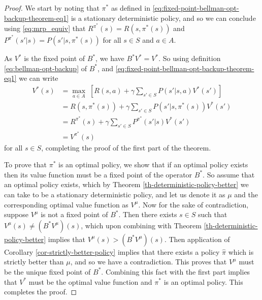 \documentclass{article}
\theoremstyle{definition}
\theoremstyle{remark}
\begin{document}
\begin{proof}
We start by noting that $\pi^{\ast}$ as defined in \eqref{eq:fixed-point-bellman-opt-backup-theorem-eq1} is a stationary deterministic policy, and so we can conclude using \eqref{eq:mrp_equiv} that $R^{\pi^{\ast}}(s) = R(s,\pi^{\ast}(s))$ and $P^{\pi^{\ast}}(s'|s)=P(s'|s,\pi^{\ast}(s))$ for all $s \in S$ and $a \in A$.

As $V^{\ast}$ is the fixed point of $B^{\ast}$, we have $B^{\ast}V^{\ast}=V^{\ast}$. So using definition \eqref{eq:bellman-opt-backup} of $B^{\ast}$, and \eqref{eq:fixed-point-bellman-opt-backup-theorem-eq1} we can write
\begin{equation}
\begin{split}
V^{\ast}(s) &= \underset{a \in A}{\max} \; \left[ R(s,a) + \gamma \sum_{s' \in S} P(s'|s,a)V^{\ast}(s') \right] \\
&= R(s,\pi^{\ast}(s)) + \gamma \sum_{s' \in S} P(s'|s,\pi^{\ast}(s))V^{\ast}(s') \\
&= R^{\pi^{\ast}}(s) + \gamma \sum_{s' \in S} P^{\pi^{\ast}}(s'|s) V^{\ast}(s') \\
&= V^{\pi^{\ast}}(s) 
\end{split}
\label{eq:fixed-point-bellman-opt-backup-proof-eq1}
\end{equation}
for all $s \in S$, completing the proof of the first part of the theorem.

To prove that $\pi^{\ast}$ is an optimal policy, we show that if an optimal policy exists then its value function must be a fixed point of the operator $B^{\ast}$. So assume that an optimal policy exists, which by Theorem \ref{th-deterministic-policy-better} we can take to be a stationary deterministic policy, and let us denote it as $\mu$ and the corresponding optimal value function as $V^{\mu}$. Now for the sake of contradiction, suppose $V^{\mu}$ is not a fixed point of $B^{\ast}$. Then there exists $s \in S$ such that $V^{\mu}(s) \neq (B^{\ast}V^{\mu})(s)$, which upon combining with Theorem \ref{th-deterministic-policy-better} implies that $V^{\mu}(s) > (B^{\ast}V^{\mu})(s)$. Then application of Corollary \ref{cor-strictly-better-policy} implies that there exists a policy $\hat{\pi}$ which is strictly better than $\mu$, and so we have a contradiction. This proves that $V^{\mu}$ must be the unique fixed point of $B^{\ast}$. Combining this fact with the first part implies that $V^{\ast}$ must be the optimal value function and $\pi^{\ast}$ is an optimal policy. This completes the proof.
\end{proof}
\end{document}

